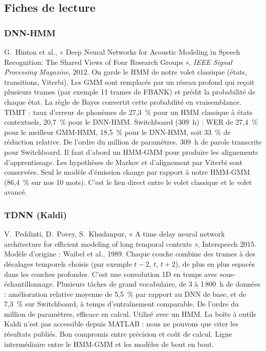 \subsection{Fiches de lecture}

\subsubsection*{DNN-HMM}
\fichemodele
{G.~Hinton et al., « Deep Neural Networks for Acoustic Modeling in Speech Recognition: The Shared Views of Four Research Groups », \emph{IEEE Signal Processing Magazine}, 2012.}
{On garde le HMM de notre volet classique (états, transitions, Viterbi). Les GMM sont remplacés par un réseau profond qui reçoit plusieurs trames (par exemple 11 trames de FBANK) et prédit la probabilité de chaque état. La règle de Bayes convertit cette probabilité en vraisemblance.}
{TIMIT : taux d'erreur de phonèmes de 27,3~\% pour un HMM classique à états contextuels, 20,7~\% pour le DNN-HMM. Switchboard (309~h) : WER de 27,4~\% pour le meilleur GMM-HMM, 18,5~\% pour le DNN-HMM, soit 33~\% de réduction relative.}
{De l'ordre du million de paramètres. 309~h de parole transcrite pour Switchboard.}
{Il faut d'abord un HMM-GMM pour produire les alignements d'apprentissage. Les hypothèses de Markov et d'alignement par Viterbi sont conservées.}
{Seul le modèle d'émission change par rapport à notre HMM-GMM (86,4~\% sur nos 10 mots). C'est le lien direct entre le volet classique et le volet avancé.}

\subsubsection*{TDNN (Kaldi)}
\fichemodele
{V.~Peddinti, D.~Povey, S.~Khudanpur, « A time delay neural network architecture for efficient modeling of long temporal contexts », Interspeech 2015. Modèle d'origine : Waibel et al., 1989.}
{Chaque couche combine des trames à des décalages temporels choisis (par exemple $t-2$, $t$, $t+2$), de plus en plus espacés dans les couches profondes. C'est une convolution 1D en temps avec sous-échantillonnage.}
{Plusieurs tâches de grand vocabulaire, de 3 à 1\,800~h de données : amélioration relative moyenne de 5,5~\% par rapport au DNN de base, et de 7,3~\% sur Switchboard, à temps d'entraînement comparable.}
{De l'ordre du million de paramètres, efficace en calcul.}
{Utilisé avec un HMM. La boîte à outils Kaldi n'est pas accessible depuis MATLAB : nous ne pouvons que citer les résultats publiés.}
{Bon compromis entre précision et coût de calcul. Ligne intermédiaire entre le HMM-GMM et les modèles de bout en bout.}

